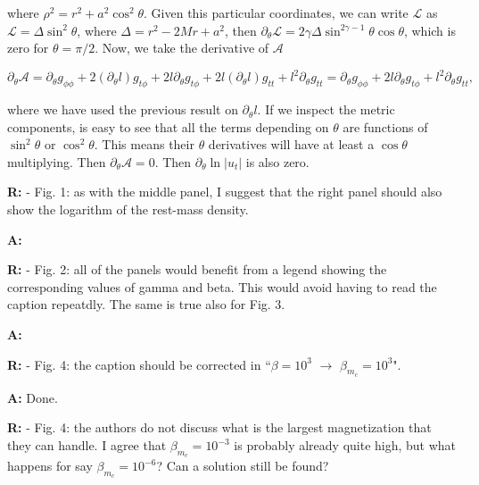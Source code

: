 \documentclass{article}
\begin{document}
where $\rho^2 = r^2 + a^2\cos^2 \theta$. Given this particular coordinates, we can write $\mathcal{L}$ as $\mathcal{L} = \Delta \sin^2 \theta$, where $\Delta = r^2 - 2Mr + a^2$, then $\partial_{\theta}\mathcal{L} = 2\gamma \Delta \sin^{2\gamma - 1} \theta \cos \theta$, which is zero for $\theta = \pi/2$. Now, we take the derivative of $\mathcal{A}$

\begin{equation}
\partial_{\theta} \mathcal{A} = \partial_{\theta} g_{\phi\phi} + 2 (\partial_{\theta} l) g_{t\phi} + 2l\partial_{\theta} g_{t\phi} + 2l(\partial_{\theta} l) g_{tt} + l^2 \partial_{\theta} g_{tt} = \partial_{\theta} g_{\phi\phi} + 2l\partial_{\theta} g_{t\phi} + l^2 \partial_{\theta} g_{tt},
\end{equation}

where we have used the previous result on $\partial_{\theta} l$. If we inspect the metric components, is easy to see that all the terms depending on $\theta$ are functions of $\sin^2 \theta$ or $\cos^2 \theta$. This means their $\theta$ derivatives will have at least a $\cos \theta$ multiplying. Then $\partial_{\theta} \mathcal{A} = 0$. Then $\partial_{\theta} \ln|u_t|$ is also zero.

\bigskip

{\bf R:} - Fig. 1: as with the middle panel, I suggest that the right
panel should also show the logarithm of the rest-mass density.

\bigskip

{\bf A:} 

\bigskip

{\bf R:} - Fig. 2: all of the panels would benefit from a legend showing the
corresponding values of gamma and beta. This would avoid having to read the caption repeatdly. The same is true also for Fig. 3.

\bigskip

{\bf A:} 

\bigskip

{\bf R:} - Fig. 4: the caption should be corrected in ``$\beta = 10^3$ $\rightarrow $ $\beta_{m_c}
= 10^3$".

\bigskip

{\bf A:} Done.

\bigskip

{\bf R:} - Fig. 4: the authors do not discuss what is the largest magnetization
that they can handle. I agree that $\beta_{m_c} = 10^{-3}$ is probably
already quite high, but what happens for say $\beta_{m_c} = 10^{-6}$? Can
a solution still be found?
\end{document}
